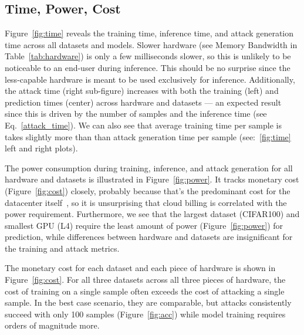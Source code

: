 \documentclass[conference]{IEEEtran}
\begin{document}
\subsection{Time, Power, Cost}
\label{res:cost}

Figure~\ref{fig:time} reveals the training time, inference time, and attack generation time across all datasets and models. Slower hardware (see Memory Bandwidth in Table~\ref{tab:hardware}) is only a few milliseconds slower, so this is unlikely to be noticeable to an end-user during inference. This should be no surprise since the less-capable hardware is meant to be used exclusively for inference. Additionally, the attack time (right sub-figure) increases with both the training (left) and prediction times (center) across hardware and datasets --- an expected result since this is driven by the number of samples and the inference time (see Eq.~\ref{attack_time}). We can also see that average training time per sample is takes slightly more than than attack generation time per sample (see:~\ref{fig:time} left and right plots).

The power consumption during training, inference, and attack generation for all hardware and datasets is illustrated in Figure~\ref{fig:power}. It tracks monetary cost (Figure~\ref{fig:cost}) closely, probably because that's the predominant cost for the datacenter itself~\cite{dayarathna2015data}, so it is unsurprising that cloud billing is correlated with the power requirement. Furthermore, we see that the largest dataset (CIFAR100) and smallest GPU (L4) require the least amount of power (Figure~\ref{fig:power}) for prediction, while differences between hardware and datasets are insignificant for the training and attack metrics. 

The monetary cost for each dataset and each piece of hardware is shown in Figure~\ref{fig:cost}. For all three datasets across all three pieces of hardware, the cost of training on a single sample often exceeds the cost of attacking a single sample. In the best case scenario, they are comparable, but attacks consistently succeed with only 100 samples (Figure~\ref{fig:acc}) while model training requires orders of magnitude more. 
\end{document}

